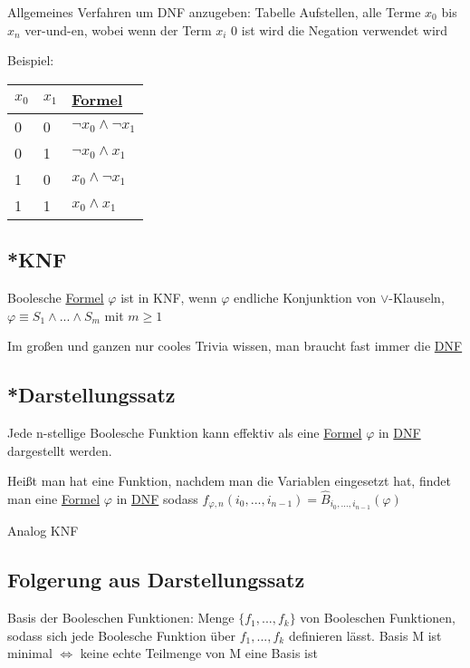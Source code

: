 \documentclass[12pt,a4paper]{article} %
\begin{document}
	Allgemeines Verfahren um DNF anzugeben: Tabelle Aufstellen, alle Terme $x_0$ bis $x_n$ ver-und-en, wobei wenn der Term $x_i$ 0 ist wird die Negation verwendet wird
	
	Beispiel:
	
	\begin{tabular}{l | l | l}
		$x_0$ & $x_1$ & \hyperref[Formel]{Formel} \\ \hline
		0 & 0 & $\neg x_0 \land \neg x_1$ \\
		0 & 1 & $\neg x_0 \land x_1$ \\
		1 & 0 & $x_0 \land \neg x_1$ \\
		1 & 1 & $x_0 \land x_1$ \\
	\end{tabular}
	
	\subsection{*KNF}
	Boolesche \hyperref[Formel]{Formel} $\varphi$ ist in KNF, wenn $\varphi$ endliche Konjunktion von $\lor$-Klauseln, $\varphi \equiv S_1 \land ... \land S_m$ mit $m \ge 1$
	
	Im großen und ganzen nur cooles Trivia wissen, man braucht fast immer die \hyperref[DNF]{DNF}
	
	\subsection{*Darstellungssatz}
	Jede n-stellige Boolesche Funktion kann effektiv als eine \hyperref[Formel]{Formel} $\varphi$ in \hyperref[DNF]{DNF} dargestellt werden. 
	
	Heißt man hat eine Funktion, nachdem man die Variablen eingesetzt hat, findet man eine \hyperref[Formel]{Formel} $\varphi$ in \hyperref[DNF]{DNF} sodass $f_{\varphi, n}(i_0, ..., i_{n-1}) = \widehat{B}_{i_0, ..., i_{n - 1}}(\varphi)$
	
	Analog KNF

	\subsection{Folgerung aus Darstellungssatz}
	Basis der Booleschen Funktionen: \newline
	Menge $\{f_1, ..., f_k\}$ von Booleschen Funktionen, sodass sich jede Boolesche Funktion über $
	f_1, ..., f_k$ definieren lässt. \newline
	Basis M ist minimal $\Leftrightarrow$ keine echte Teilmenge von M eine Basis ist
	
\end{document}
